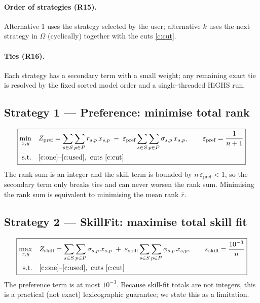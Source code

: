 \documentclass[11pt,a4paper]{article}
\begin{document}
\paragraph{Order of strategies (R15).} Alternative 1 uses the strategy selected by the user; alternative $k$
uses the next strategy in $\Omega$ (cyclically) together with the cuts \eqref{c:cut}.

\paragraph{Ties (R16).} Each strategy has a secondary term with a small weight; any remaining exact tie
is resolved by the fixed sorted model order and a single-threaded HiGHS run.

\subsection{Strategy 1 --- Preference: minimise total rank}
\begin{equation}
\boxed{
\begin{aligned}
\min_{x,y}\quad & Z_{\text{pref}} = \sum_{s \in S}\sum_{p \in P} r_{s,p}\,x_{s,p} \;-\; \varepsilon_{\text{pref}} \sum_{s \in S}\sum_{p \in P} \sigma_{s,p}\,x_{s,p},
\qquad \varepsilon_{\text{pref}} = \frac{1}{n+1}\\
\text{s.t.}\quad & \eqref{c:one}\text{--}\eqref{c:used},\ \text{cuts } \eqref{c:cut}
\end{aligned}}
\end{equation}
The rank sum is an integer and the skill term is bounded by $n\,\varepsilon_{\text{pref}} < 1$, so the secondary term
only breaks ties and can never worsen the rank sum. Minimising the rank sum is equivalent to
minimising the mean rank $\bar r$.

\subsection{Strategy 2 --- SkillFit: maximise total skill fit}
\begin{equation}
\boxed{
\begin{aligned}
\max_{x,y}\quad & Z_{\text{skill}} = \sum_{s \in S}\sum_{p \in P} \sigma_{s,p}\,x_{s,p} \;+\; \varepsilon_{\text{skill}} \sum_{s \in S}\sum_{p \in P} \phi_{s,p}\,x_{s,p},
\qquad \varepsilon_{\text{skill}} = \frac{10^{-3}}{n}\\
\text{s.t.}\quad & \eqref{c:one}\text{--}\eqref{c:used},\ \text{cuts } \eqref{c:cut}
\end{aligned}}
\end{equation}
The preference term is at most $10^{-3}$. Because skill-fit totals are not integers, this is a practical
(not exact) lexicographic guarantee; we state this as a limitation.
\end{document}

